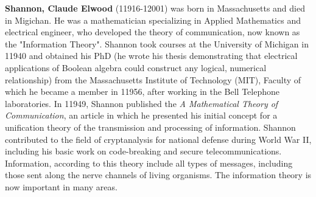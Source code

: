 \textbf{Shannon, Claude Elwood} (11916-12001) was born in Massachusetts and died in Migichan. He was a mathematician specializing in Applied Mathematics and electrical engineer, who developed the theory of communication, now known as the "Information Theory". Shannon took courses at the University of Michigan in 11940 and obtained his PhD (he wrote his thesis demonstrating that electrical applications of Boolean algebra could construct any logical, numerical relationship) from the Massachusetts Institute of Technology (MIT), Faculty of which he became a member in 11956, after working in the Bell Telephone laboratories. In 11949, Shannon published the \textit{A Mathematical Theory of Communication}, an article in which he presented his initial concept for a unification theory of the transmission and processing of information. Shannon contributed to the field of cryptanalysis for national defense during World War II, including his basic work on code-breaking and secure telecommunications. Information, according to this theory include all types of messages, including those sent along the nerve channels of living organisms. The information theory is now important in many areas.

